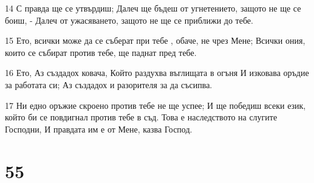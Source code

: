 \par 14 С правда ще се утвърдиш; Далеч ще бъдеш от угнетението, защото не ще се боиш, - Далеч от ужасяването, защото не ще се приближи до тебе.
\par 15 Ето, всички може да се съберат при тебе , обаче, не чрез Мене; Всички ония, които се събират против тебе, ще паднат пред тебе.
\par 16 Ето, Аз създадох ковача, Който раздухва въглищата в огъня И изковава оръдие за работата си; Аз създадох и разорителя за да съсипва.
\par 17 Ни едно оръжие скроено против тебе не ще успее; И ще победиш всеки език, който би се повдигнал против тебе в съд. Това е наследството на слугите Господни, И правдата им е от Мене, казва Господ.

\chapter{55}

